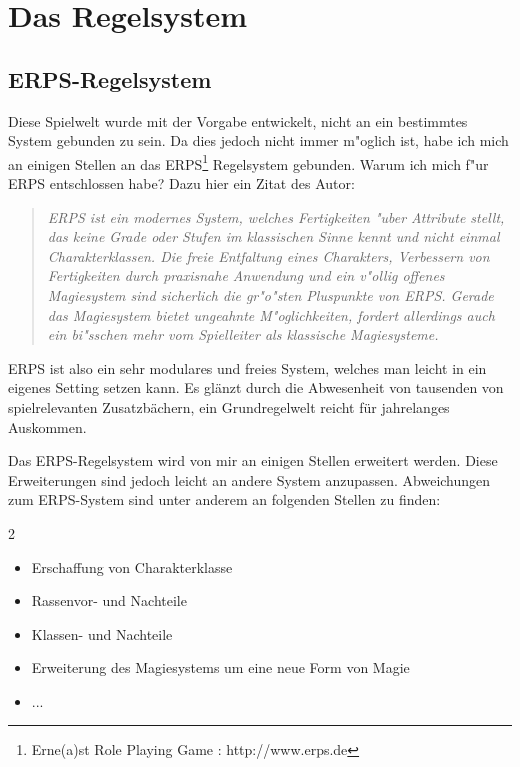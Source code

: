 \chapter{Das Regelsystem}

\section{ERPS-Regelsystem}
\par Diese Spielwelt wurde mit der Vorgabe entwickelt, nicht an ein bestimmtes System gebunden zu sein. Da 
dies jedoch nicht immer m"oglich ist, habe ich mich an einigen Stellen an das ERPS\footnote{Erne(a)st Role 
Playing Game : http://www.erps.de} Regelsystem gebunden. Warum ich mich f"ur ERPS entschlossen habe? Dazu 
hier ein Zitat des Autor:
\begin{quotation}
\par\textit{ERPS ist ein \glqq modernes\grqq{} System, welches Fertigkeiten "uber Attribute stellt, das keine 
Grade oder Stufen im klassischen Sinne kennt und nicht einmal Charakterklassen. Die freie Entfaltung eines 
Charakters, Verbessern von Fertigkeiten durch praxisnahe Anwendung und ein v"ollig offenes Magiesystem sind 
sicherlich die gr"o"sten Pluspunkte von ERPS. Gerade das Magiesystem bietet ungeahnte M"oglichkeiten, fordert 
allerdings auch ein bi"sschen mehr vom Spielleiter als klassische Magiesysteme.}
\end{quotation}
\par ERPS ist also ein sehr modulares und freies System, welches man leicht in ein eigenes Setting setzen kann. 
Es glänzt durch die Abwesenheit von tausenden von spielrelevanten Zusatzbächern, ein Grundregelwelt reicht für 
jahrelanges Auskommen.
\par Das ERPS-Regelsystem wird von mir an einigen Stellen erweitert werden. Diese Erweiterungen sind jedoch leicht 
an andere System anzupassen. Abweichungen zum ERPS-System sind unter anderem an folgenden Stellen zu finden:
\begin{multicols}{2}
\begin{itemize}
\item Erschaffung von Charakterklasse
\item Rassenvor- und Nachteile
\item Klassen- und Nachteile
\item Erweiterung des Magiesystems um eine neue Form von Magie
\item ...
\end{itemize}
\end{multicols}

